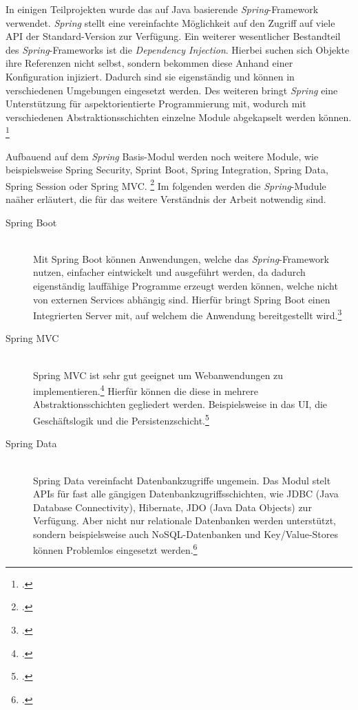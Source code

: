 In einigen Teilprojekten wurde das auf Java basierende \textit{Spring}-Framework verwendet. \textit{Spring} stellt eine vereinfachte Möglichkeit auf den Zugriff auf viele \ac{API} der Standard-Version zur Verfügung. Ein weiterer wesentlicher Bestandteil des \textit{Spring}-Frameworks ist die \textit{Dependency Injection}. Hierbei suchen sich Objekte ihre Referenzen nicht selbst, sondern bekommen diese Anhand einer Konfiguration injiziert. Dadurch sind sie eigenständig und können in verschiedenen Umgebungen eingesetzt werden. Des weiteren bringt \textit{Spring} eine Unterstützung für aspektorientierte Programmierung mit, wodurch mit verschiedenen Abstraktionsschichten einzelne Module abgekapselt werden können. \footcite[Vgl.][2]{spring3}

Aufbauend auf dem \textit{Spring} Basis-Modul werden noch weitere Module, wie beispielsweise Spring Security, Sprint Boot, Spring Integration, Spring Data, Spring Session oder Spring MVC. \footcite[Vgl.][2]{springPivotal} Im folgenden werden die \textit{Spring}-Mudule naäher erläutert, die für das weitere Verständnis der Arbeit notwendig sind.

\begin{description}
  \item[Spring Boot] \hfill \\
    Mit Spring Boot können Anwendungen, welche das \textit{Spring}-Framework nutzen, einfacher eintwickelt und ausgeführt werden, da dadurch eigenständig lauffähige Programme erzeugt werden können, welche nicht von externen Services abhängig sind. Hierfür bringt Spring Boot einen Integrierten Server mit, auf welchem die Anwendung bereitgestellt wird.\footcite[Vgl.][1]{springBoot}
  \item[Spring MVC] \hfill \\
    Spring MVC ist sehr gut geeignet um Webanwendungen zu implementieren.\footcite[Vgl.][3]{spring3} Hierfür können die diese in mehrere Abstraktionsschichten gegliedert werden. Beispielsweise in das \ac{UI}, die Geschäftslogik und die Persistenzschicht.\footcite[Vgl.][21]{springMvc}
  \item[Spring Data] \hfill \\
    Spring Data vereinfacht Datenbankzugriffe ungemein. Das Modul stelt \ac{API}s für fast alle gängigen Datenbankzugriffsschichten, wie JDBC (Java Database Connectivity), Hibernate, JDO (Java Data Objects) zur Verfügung. Aber nicht nur relationale Datenbanken werden unterstützt, sondern beispielsweise auch NoSQL-Datenbanken und Key/Value-Stores können Problemlos eingesetzt werden.\footcite[Vgl.][3f]{springData}
\end{description}

